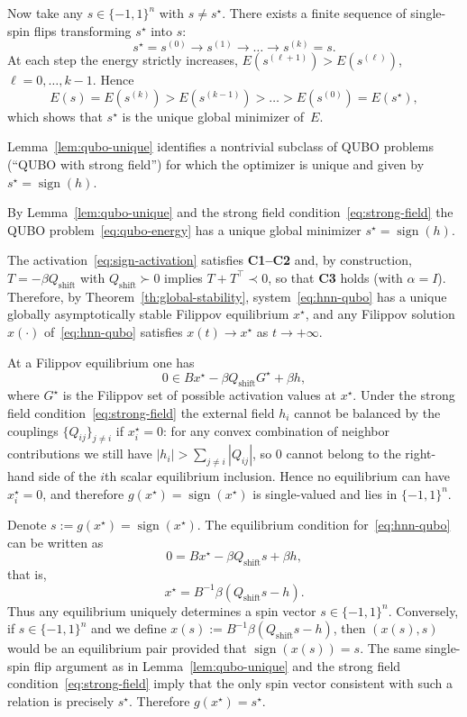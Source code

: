 \documentclass[journal]{IEEEtran}
\begin{document}
\begin{IEEEproof}
Now take any $s \in \{-1,1\}^n$ with $s \neq s^\star$.
There exists a finite sequence of single-spin flips transforming $s^\star$
into $s$:
\[
  s^\star = s^{(0)} \to s^{(1)} \to \dots \to s^{(k)} = s.
\]
At each step the energy strictly increases,
$E(s^{(\ell+1)}) > E(s^{(\ell)})$, $\ell=0,\dots,k-1$.
Hence
\[
  E(s) = E(s^{(k)}) > E(s^{(k-1)}) > \dots > E(s^{(0)}) = E(s^\star),
\]
which shows that $s^\star$ is the unique global minimizer of~$E$.
\end{IEEEproof}

\medskip
Lemma~\ref{lem:qubo-unique} identifies a nontrivial subclass of QUBO problems
(``QUBO with strong field'') for which the optimizer is unique and given by
$s^\star = \operatorname{sign}(h)$.

\medskip
\begin{IEEEproof}
By Lemma~\ref{lem:qubo-unique} and the strong field
condition~\eqref{eq:strong-field} the QUBO problem~\eqref{eq:qubo-energy}
has a unique global minimizer $s^\star = \operatorname{sign}(h)$.

The activation~\eqref{eq:sign-activation} satisfies \textbf{C1--C2} and, by construction,
$T = -\beta Q_{\mathrm{shift}}$ with $Q_{\mathrm{shift}} \succ 0$ implies
$T+T^\top \prec 0$, so that \textbf{C3} holds (with $\alpha=I$).
Therefore, by Theorem~\ref{th:global-stability}, system~\eqref{eq:hnn-qubo}
has a unique globally asymptotically stable Filippov equilibrium $x^\star$,
and any Filippov solution $x(\cdot)$ of~\eqref{eq:hnn-qubo} satisfies
$x(t) \to x^\star$ as $t \to +\infty$.

At a Filippov equilibrium one has
\[
  0 \in B x^\star - \beta Q_{\mathrm{shift}} G^\star + \beta h,
\]
where $G^\star$ is the Filippov set of possible activation values at $x^\star$.
Under the strong field condition~\eqref{eq:strong-field} the external field
$h_i$ cannot be balanced by the couplings $\{Q_{ij}\}_{j \neq i}$ if $x_i^\star = 0$:
for any convex combination of neighbor contributions we still have
$|h_i| > \sum_{j \neq i} |Q_{ij}|$, so $0$ cannot belong to the right-hand side
of the $i$th scalar equilibrium inclusion.
Hence no equilibrium can have $x_i^\star = 0$, and therefore
$g(x^\star) = \operatorname{sign}(x^\star)$ is single-valued and lies in
$\{-1,1\}^n$.

Denote $s := g(x^\star) = \operatorname{sign}(x^\star)$.
The equilibrium condition for~\eqref{eq:hnn-qubo} can be written as
\[
  0 = B x^\star - \beta Q_{\mathrm{shift}} s + \beta h,
\]
that is,
\[
  x^\star = B^{-1} \beta (Q_{\mathrm{shift}} s - h).
\]
Thus any equilibrium uniquely determines a spin vector $s \in \{-1,1\}^n$.
Conversely, if $s \in \{-1,1\}^n$ and we define
$x(s) := B^{-1} \beta (Q_{\mathrm{shift}} s - h)$, then $(x(s),s)$ would be
an equilibrium pair provided that $\operatorname{sign}(x(s)) = s$.
The same single-spin flip argument as in Lemma~\ref{lem:qubo-unique} and the
strong field condition~\eqref{eq:strong-field} imply that the only spin vector
consistent with such a relation is precisely $s^\star$.
Therefore $g(x^\star) = s^\star$.


\end{IEEEproof}
\end{document}
